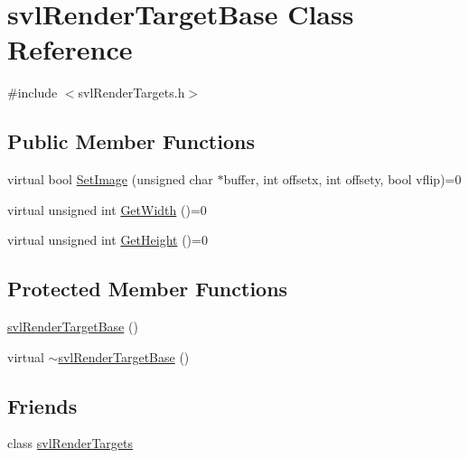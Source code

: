 \hypertarget{classsvl_render_target_base}{\section{svl\-Render\-Target\-Base Class Reference}
\label{classsvl_render_target_base}
}


{\ttfamily \#include $<$svl\-Render\-Targets.\-h$>$}

\subsection*{Public Member Functions}
\begin{DoxyCompactItemize}
\item 
virtual bool \hyperlink{classsvl_render_target_base_ae65b2538bea48d50813515c7077d8c6a}{Set\-Image} (unsigned char $\ast$buffer, int offsetx, int offsety, bool vflip)=0
\item 
virtual unsigned int \hyperlink{classsvl_render_target_base_afad55b6bc36ee21e20556671860802d7}{Get\-Width} ()=0
\item 
virtual unsigned int \hyperlink{classsvl_render_target_base_a758a963eab79b5c3cfc22b301693c9b7}{Get\-Height} ()=0
\end{DoxyCompactItemize}
\subsection*{Protected Member Functions}
\begin{DoxyCompactItemize}
\item 
\hyperlink{classsvl_render_target_base_a9c73fd8b304e922b0110757d61c81a75}{svl\-Render\-Target\-Base} ()
\item 
virtual \hyperlink{classsvl_render_target_base_a18904f3f077b97a1a4ea0ffa81573218}{$\sim$svl\-Render\-Target\-Base} ()
\end{DoxyCompactItemize}
\subsection*{Friends}
\begin{DoxyCompactItemize}
\item 
class \hyperlink{classsvl_render_target_base_ad804de78e5a33b34b46d99e75bab0aed}{svl\-Render\-Targets}
\end{DoxyCompactItemize}


